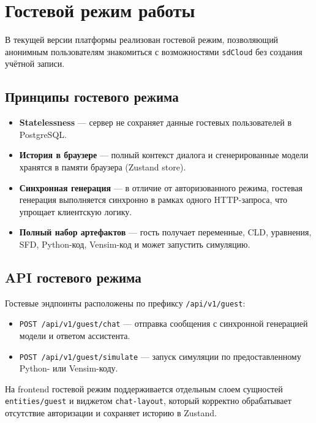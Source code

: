 \section{Гостевой режим работы}

В текущей версии платформы реализован гостевой режим, позволяющий анонимным пользователям знакомиться с возможностями \texttt{sdCloud} без создания учётной записи.

\subsection{Принципы гостевого режима}

\begin{itemize}
    \item \textbf{Statelessness} --- сервер не сохраняет данные гостевых пользователей в PostgreSQL.
    \item \textbf{История в браузере} --- полный контекст диалога и сгенерированные модели хранятся в памяти браузера (Zustand store).
    \item \textbf{Синхронная генерация} --- в отличие от авторизованного режима, гостевая генерация выполняется синхронно в рамках одного HTTP-запроса, что упрощает клиентскую логику.
    \item \textbf{Полный набор артефактов} --- гость получает переменные, CLD, уравнения, SFD, Python-код, Vensim-код и может запустить симуляцию.
\end{itemize}

\subsection{API гостевого режима}

Гостевые эндпоинты расположены по префиксу \texttt{/api/v1/guest}:

\begin{itemize}
    \item \texttt{POST /api/v1/guest/chat} --- отправка сообщения с синхронной генерацией модели и ответом ассистента.
    \item \texttt{POST /api/v1/guest/simulate} --- запуск симуляции по предоставленному Python- или Vensim-коду.
\end{itemize}

На frontend гостевой режим поддерживается отдельным слоем сущностей \texttt{entities/guest} и виджетом \texttt{chat-layout}, который корректно обрабатывает отсутствие авторизации и сохраняет историю в Zustand.

